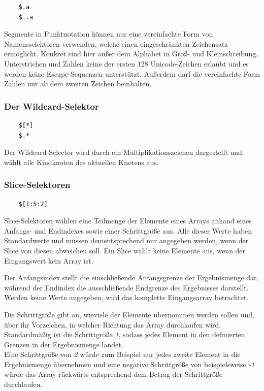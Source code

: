 \documentclass[oneside]{ausarbeitung}
\begin{document}
\begin{lstlisting}
	$.a
	$..a
\end{lstlisting}
	
Segmente in Punktnotation können nur eine vereinfachte Form von Namensselektoren verwenden, welche einen eingeschränkten Zeichensatz ermöglicht. Konkret sind hier außer dem Alphabet in Groß- und Kleinschreibung, Unterstrichen und Zahlen keine der ersten 128 Unicode-Zeichen erlaubt und es werden keine Escape-Sequenzen unterstützt. Außerdem darf die vereinfachte Form Zahlen nur ab dem zweiten Zeichen beinhalten.
	


\pagebreak
	
\subsubsection{Der Wildcard-Selektor}
	
\begin{lstlisting}
	$[*]
	$.*
\end{lstlisting}
	
Der Wildcard-Selector wird durch ein Multiplikationszeichen dargestellt und wählt alle Kindknoten des aktuellen Knotens aus.
	
	
	
\subsubsection{Slice-Selektoren}
	
\begin{lstlisting}
	$[1:5:2]
\end{lstlisting}
	
Slice-Selektoren wählen eine Teilmenge der Elemente eines Arrays anhand eines Anfangs- und Endindexes sowie einer Schrittgröße aus. Alle dieser Werte haben Standardwerte und müssen dementsprechend nur angegeben werden, wenn der Slice von diesen abweichen soll. Ein Slice wählt keine Elemente aus, wenn der Eingangswert kein Array ist.
	
Der Anfangsindex stellt die einschließende Anfangsgrenze der Ergebnismenge dar, während der Endindex die ausschließende Endgrenze des Ergebnisses darstellt. Werden keine Werte angegeben, wird das komplette Eingangsarray betrachtet.
	 
Die Schrittgröße gibt an, wieviele der Elemente übernommen werden sollen und, über ihr Vorzeichen, in welcher Richtung das Array durchlaufen wird. Standardmäßig ist die Schrittgröße \textit{1}, sodass jedes Element in den definierten Grenzen in der Ergebnismenge landet. \\
Eine Schrittgröße von \textit{2} würde zum Beispiel nur jedes zweite Element in die Ergebnismenge übernehmen und eine negative Schrittgröße von beispielsweise \textit{-1} würde das Array rückwärts entsprechend dem Betrag der Schrittgröße durchlaufen. 
	 
\end{document}
